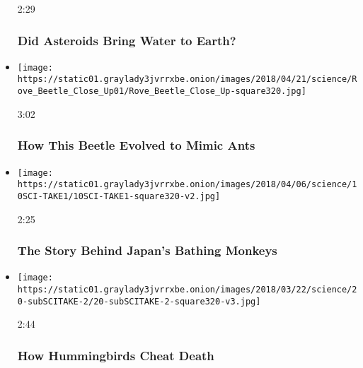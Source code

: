 \begin{itemize}
  2:29

  \hypertarget{did-asteroids-bring-water-to-earth}{%
  \subsubsection{Did Asteroids Bring Water to
  Earth?}\label{did-asteroids-bring-water-to-earth}}
\item
  \href{https://www.nytimes3xbfgragh.onion/video/science/100000005813865/how-this-beetle-evolved-to-mimic-ants.html?action=click\&module=video-series-bar\&region=header\&pgtype=Article\&playlistId=video/sciencetake}{}

  \texttt{[image: https://static01.graylady3jvrrxbe.onion/images/2018/04/21/science/Rove\_Beetle\_Close\_Up01/Rove\_Beetle\_Close\_Up-square320.jpg]}

  3:02

  \hypertarget{how-this-beetle-evolved-to-mimic-ants}{%
  \subsubsection{How This Beetle Evolved to Mimic
  Ants}\label{how-this-beetle-evolved-to-mimic-ants}}
\item
  \href{https://www.nytimes3xbfgragh.onion/video/science/100000005800676/the-story-behind-japans-bathing-monkeys.html?action=click\&module=video-series-bar\&region=header\&pgtype=Article\&playlistId=video/sciencetake}{}

  \texttt{[image: https://static01.graylady3jvrrxbe.onion/images/2018/04/06/science/10SCI-TAKE1/10SCI-TAKE1-square320-v2.jpg]}

  2:25

  \hypertarget{the-story-behind-japans-bathing-monkeys}{%
  \subsubsection{The Story Behind Japan's Bathing
  Monkeys}\label{the-story-behind-japans-bathing-monkeys}}
\item
  \href{https://www.nytimes3xbfgragh.onion/video/science/100000005789167/how-hummingbirds-cheat-death.html?action=click\&module=video-series-bar\&region=header\&pgtype=Article\&playlistId=video/sciencetake}{}

  \texttt{[image: https://static01.graylady3jvrrxbe.onion/images/2018/03/22/science/20-subSCITAKE-2/20-subSCITAKE-2-square320-v3.jpg]}

  2:44

  \hypertarget{how-hummingbirds-cheat-death}{%
  \subsubsection{How Hummingbirds Cheat
  Death}\label{how-hummingbirds-cheat-death}}
\end{itemize}

